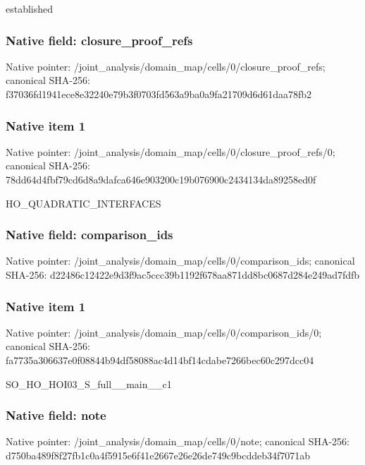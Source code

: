 \documentclass[10pt,a4paper]{article}
\begin{document}
\begingroup\raggedright\sloppy established\par\endgroup

\subsubsection{Native field: closure\_\allowbreak{}proof\_\allowbreak{}refs}
Native pointer: /joint\_\allowbreak{}analysis/domain\_\allowbreak{}map/cells/0/closure\_\allowbreak{}proof\_\allowbreak{}refs; canonical SHA-256: f37036fd1941ece8e32240e79b3f0703fd563a9ba0a9fa21709d6d61daa78fb2

\subsubsection{Native item 1}
Native pointer: /joint\_\allowbreak{}analysis/domain\_\allowbreak{}map/cells/0/closure\_\allowbreak{}proof\_\allowbreak{}refs/0; canonical SHA-256: 78dd64d4fbf79cd6d8a9dafca646e903200c19b076900c2434134da89258ed0f

\begingroup\raggedright\sloppy HO\_\allowbreak{}QUADRATIC\_\allowbreak{}INTERFACES\par\endgroup

\subsubsection{Native field: comparison\_\allowbreak{}ids}
Native pointer: /joint\_\allowbreak{}analysis/domain\_\allowbreak{}map/cells/0/comparison\_\allowbreak{}ids; canonical SHA-256: d22486c12422e9d3f9ac5ccc39b1192f678aa871dd8bc0687d284e249ad7fdfb

\subsubsection{Native item 1}
Native pointer: /joint\_\allowbreak{}analysis/domain\_\allowbreak{}map/cells/0/comparison\_\allowbreak{}ids/0; canonical SHA-256: fa7735a306637e0f08844b94df58088ac4d14bf14cdabe7266bec60c297dcc04

\begingroup\raggedright\sloppy SO\_\allowbreak{}HO\_\allowbreak{}HOI03\_\allowbreak{}S\_\allowbreak{}full\_\allowbreak{}\_\allowbreak{}main\_\allowbreak{}\_\allowbreak{}c1\par\endgroup

\subsubsection{Native field: note}
Native pointer: /joint\_\allowbreak{}analysis/domain\_\allowbreak{}map/cells/0/note; canonical SHA-256: d750ba489f8f27fb1c0a4f5915e6f41e2667e26e26de749c9bcddeb34f7071ab
\end{document}
